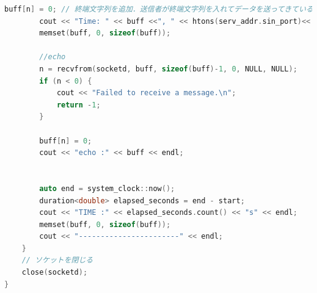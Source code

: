 \documentclass[fleqn, a4paper. 12pt]{ltjsarticle}
\begin{document}
\begin{lstlisting}[language=C++]
        buff[n] = 0; // 終端文字列を追加．送信者が終端文字列を入れてデータを送ってきているとは限らない．
        cout << "Time: " << buff <<", " << htons(serv_addr.sin_port)<< "\n";
        memset(buff, 0, sizeof(buff));

        //echo
        n = recvfrom(socketd, buff, sizeof(buff)-1, 0, NULL, NULL);
        if (n < 0) {
            cout << "Failed to receive a message.\n";
            return -1;
        }

        buff[n] = 0;
        cout << "echo :" << buff << endl;


        auto end = system_clock::now();
        duration<double> elapsed_seconds = end - start;
        cout << "TIME :" << elapsed_seconds.count() << "s" << endl;
        memset(buff, 0, sizeof(buff));
        cout << "-----------------------" << endl;
    }
    // ソケットを閉じる
    close(socketd);
}
\end{lstlisting}
\end{document}
